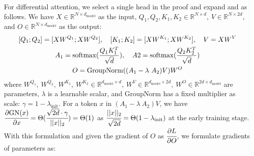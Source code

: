 \documentclass{article}
\newcommand{\softmax}{\mathrm{softmax}}
\newcommand\ourattn{differential attention}
\begin{document}
For \ourattn{}, we select a single head in the proof and expand  and  as follows.
We have $X \in \mathbb{R}^{N \times d_{\text{model}}}$ as the input, $Q_1, Q_2, K_1, K_2 \in \mathbb{R}^{N \times d}, \ V \in \mathbb{R}^{N \times 2d}$, and $O \in \mathbb{R}^{N \times d_{\text{model}}}$ as the output:
\begin{equation}
\begin{gathered}
\label{eq:rediff}
\relax [Q_1 ; Q_2] = [X W^{Q_1} ; X W^{Q_2}] ,\quad [K_1 ; K_2] = [X W^{K_1} ; X W^{K_2}] ,\quad V = X W^V \\
A_1 = \softmax(\frac{Q_1 K^{T}_1}{\sqrt{d}}), \quad A2 = \softmax(\frac{Q_2 K^{T}_2}{\sqrt{d}}) \\
O = \operatorname{GroupNorm}((A_1 - \lambda~A_2) V)W^O
\end{gathered}    
\end{equation}
where $W^{Q_1},\ W^{Q_2},\ W^{K_1},\ W^{K_2} \in \mathbb{R}^{d_{\text{model}} \times d},\ W^V \in \mathbb{R}^{d_{\text{model}} \times 2d},\ W^O \in \mathbb{R}^{2d \times d_{\text{model}}}$ are parameters, $\lambda$ is a learnable scalar, and GroupNorm has a fixed multiplier as scale: $\gamma = 1 - \lambda_{\text{init}}$. For a token $x$ in $(A_1 - \lambda~A_2)V$, we have $\cfrac{\partial \text{GN}(x)}{\partial x} = \Theta(\cfrac{\sqrt{2d} \cdot \gamma}{||x||_2}) = \Theta(1)$ as $\cfrac{||x||_2}{\sqrt{2d}}=\Theta(1-\lambda_{\text{init}})$ at the early training stage.
With this formulation and given the gradient of $O$ as $\cfrac{\partial L}{\partial O}$, we formulate gradients of parameters as:
\end{document}

